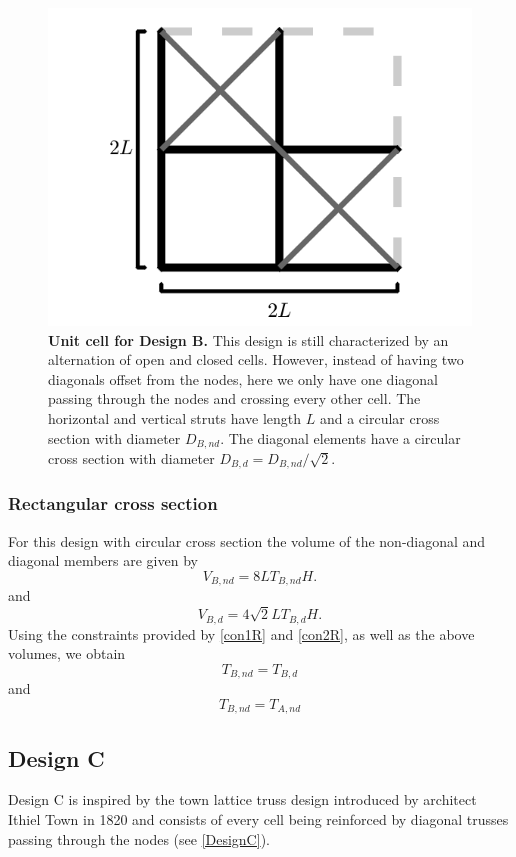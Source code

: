 \documentclass[10pt,twoside]{fernandes_supp}
\begin{document}
\begin{figure}[H]
    \centering
    \includegraphics[width=0.4\linewidth]{SFig3.png}
    \caption{{\bf Unit cell for Design B.} This design is still characterized by an alternation of open and closed cells. However, instead of having two  diagonals offset from the nodes, here we only have one diagonal passing through the nodes and crossing every other cell. The horizontal and vertical struts have length $L$ and a circular cross section with diameter $D_{B,nd}$. The diagonal elements have a circular cross section  with diameter $D_{B,d}={D_{B,nd}}/{\sqrt{2}}$.}
    \label{DesignB}
\end{figure}

\subsubsection{Rectangular cross section}
For this design with circular cross section the volume of the non-diagonal and diagonal members  are given by
\begin{equation}
		V_{B,nd}=8LT_{B,nd}H.
\end{equation}
and
\begin{equation}
		V_{B,d}=4\sqrt{2}LT_{B,d}H.
\end{equation}
Using the constraints provided by \cref{con1R} and \cref{con2R}, as well as the above volumes, we  obtain
\begin{equation}
	T_{B,nd}=T_{B,d}
\end{equation}
and
\begin{equation}
	T_{B,nd}=T_{A,nd}
\end{equation}

\subsection{Design C}
Design C is inspired by the town lattice truss design introduced by architect Ithiel Town in 1820 \citep{waddell1916} and consists of every cell being reinforced by diagonal trusses passing through the nodes (see \cref{DesignC}).
\end{document}
